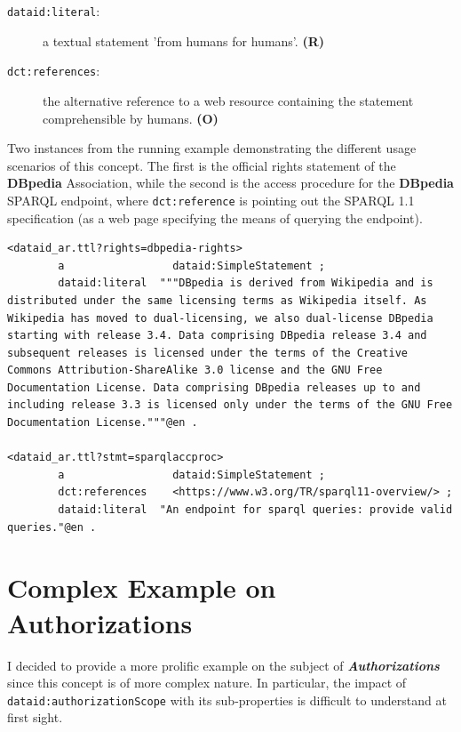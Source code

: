 \documentclass[a4paper,english,twoside,BCOR1.5cm,headsepline,DIV12,appendixprefix,final,12pt]{scrbook}
\newcommand{\dbpedia}{{\ttfamily\bfseries DBpedia}\xspace}
\newcommand{\prop}[1]{{{\texttt{#1}}}}
\newcommand{\important}[1]{\textbf{\textit{#1}}}
\begin{document}
\begin{description}
\item[\prop{dataid:literal}:] a textual statement 'from humans for humans'. \textbf{(R)}
\item[\prop{dct:references}:] the alternative reference to a web resource containing the  statement comprehensible by humans. \textbf{(O)}
\end{description}

Two instances from the running example demonstrating the different usage scenarios of this concept. The first is the official rights statement of the \dbpedia Association, while the second is the access procedure for the \dbpedia SPARQL endpoint, where \prop{dct:reference} is pointing out the SPARQL 1.1 specification (as a web page specifying the means of querying the endpoint).
\\
\begin{lstlisting}[language=ttl, captionpos=b,caption=Example of an organisation,label=lst:coresuperset,linewidth=\columnwidth,breaklines=true]
<dataid_ar.ttl?rights=dbpedia-rights>
        a                 dataid:SimpleStatement ;                                            
        dataid:literal  """DBpedia is derived from Wikipedia and is distributed under the same licensing terms as Wikipedia itself. As Wikipedia has moved to dual-licensing, we also dual-license DBpedia starting with release 3.4. Data comprising DBpedia release 3.4 and subsequent releases is licensed under the terms of the Creative Commons Attribution-ShareAlike 3.0 license and the GNU Free Documentation License. Data comprising DBpedia releases up to and including release 3.3 is licensed only under the terms of the GNU Free Documentation License."""@en .

<dataid_ar.ttl?stmt=sparqlaccproc>
        a                 dataid:SimpleStatement ;                                            
        dct:references    <https://www.w3.org/TR/sparql11-overview/> ;                        
        dataid:literal  "An endpoint for sparql queries: provide valid queries."@en .
\end{lstlisting}

\section{Complex Example on Authorizations} 
\label{sec:exauthorization}

I decided to provide a more prolific example on the subject of \important{Authorizations} since this concept is of more complex nature. In particular, the impact of \prop{dataid:authorizationScope} with its sub-properties is difficult to understand at first sight.
\end{document}
